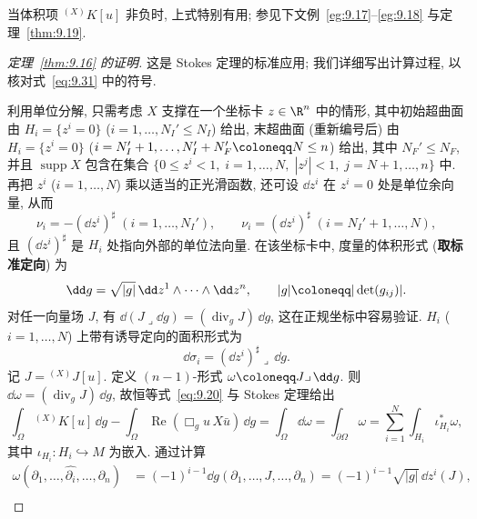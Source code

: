 当体积项 ${}^{(X)} K[u]$ 非负时, 上式特别有用; 参见下文例~\ref{eg:9.17}--\ref{eg:9.18} 与定理~\ref{thm:9.19}.

\begin{proof}[定理~\ref{thm:9.16} 的证明]
这是 Stokes 定理的标准应用; 我们详细写出计算过程, 以核对式~\eqref{eq:9.31} 中的符号.

利用单位分解, 只需考虑 $X$ 支撑在一个坐标卡 $z \in \R^n$ 中的情形, 其中初始超曲面由 $H_i = \{z^i = 0\}$ ($i = 1, \ldots, N_I' \le N_I$) 给出, 末超曲面 (重新编号后) 由 $H_i = \{z^i = 0\}$ ($i = N_I' + 1, \ldots, N_I' + N_F' \defeq N \le n$) 给出, 其中 $N_F' \le N_F$, 并且 $\operatorname{supp} X$ 包含在集合 $\{0 \le z^i < 1, \; i = 1, \ldots, N, \; |z^j| < 1, \; j = N+1, \ldots, n\}$ 中. 再把 $z^i$ ($i = 1, \ldots, N$) 乘以适当的正光滑函数, 还可设 $\dd z^i$ 在 $z^i = 0$ 处是单位余向量, 从而
\begin{equation}\label{eq:9.32}
    \nu_i = -(\dd z^i)^\sharp \; (i = 1, \ldots, N_I'), \qquad \nu_i = (\dd z^i)^\sharp \; (i = N_I' + 1, \ldots, N),
\end{equation}
且 $(\dd z^i)^\sharp$ 是 $H_i$ 处指向外部的单位法向量. 在该坐标卡中, 度量的体积形式 (\textbf{取标准定向}) 为
\begin{equation}\label{eq:9.33}
    \dd g = \sqrt{|g|} \, \dd z^1 \wedge \cdots \wedge \dd z^n, \qquad |g| \defeq |\det(g_{ij})|.
\end{equation}
对任一向量场 $J$, 有 $\dd (J \lrcorner \dd g) = (\operatorname{div}_g J) \, \dd g$, 这在正规坐标中容易验证. $H_i$ ($i = 1, \ldots, N$) 上带有诱导定向的面积形式为
\begin{equation}\label{eq:9.34}
    \dd \sigma_i = (\dd z^i)^\sharp \lrcorner \, \dd g.
\end{equation}
记 $J = {}^{(X)} J[u]$. 定义 $(n-1)$-形式 $\omega \defeq J \lrcorner \, \dd g$. 则 $\dd \omega = (\operatorname{div}_g J) \, \dd g$, 故恒等式~\eqref{eq:9.20} 与 Stokes 定理给出
\begin{equation}\label{eq:9.35}
    \int_{\Omega} {}^{(X)} K[u] \, \dd g - \int_{\Omega} \operatorname{Re}(\Box_g u \, X \bar u) \, \dd g = \int_{\Omega} \dd \omega = \int_{\partial \Omega} \omega = \sum_{i=1}^{N} \int_{H_i} \iota_{H_i}^* \omega,
\end{equation}
其中 $\iota_{H_i} \colon H_i \hookrightarrow M$ 为嵌入. 通过计算
\begin{equation}\label{eq:9.36}
    \begin{aligned}
        \omega(\partial_1, \ldots, \widehat{\partial_i}, \ldots, \partial_n) &= (-1)^{i-1} \dd g(\partial_1, \ldots, J, \ldots, \partial_n) = (-1)^{i-1} \sqrt{|g|} \, \dd z^i(J), \\

\end{aligned}
\end{equation}
\end{proof}
